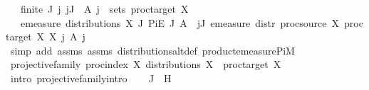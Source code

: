\begin{isabellebody}
\ \ \ {\isachardoublequoteopen}finite\ J{\isachardoublequoteclose}\ {\isachardoublequoteopen}{\isasymAnd}j{\isachardot}{\kern0pt}\ j{\isasymin}J\ {\isasymLongrightarrow}\ A\ j\ {\isasymin}\ sets\ {\isacharparenleft}{\kern0pt}proc{\isacharunderscore}{\kern0pt}target\ X{\isacharparenright}{\kern0pt}{\isachardoublequoteclose}\isanewline
\ \ \ {\isachardoublequoteopen}emeasure\ {\isacharparenleft}{\kern0pt}distributions\ X\ J{\isacharparenright}{\kern0pt}\ {\isacharparenleft}{\kern0pt}Pi\isactrlsub E\ J\ A{\isacharparenright}{\kern0pt}\ {\isacharequal}{\kern0pt}\ {\isacharparenleft}{\kern0pt}{\isasymProd}j{\isasymin}J{\isachardot}{\kern0pt}\ emeasure\ {\isacharparenleft}{\kern0pt}distr\ {\isacharparenleft}{\kern0pt}proc{\isacharunderscore}{\kern0pt}source\ X{\isacharparenright}{\kern0pt}\ {\isacharparenleft}{\kern0pt}proc{\isacharunderscore}{\kern0pt}target\ X{\isacharparenright}{\kern0pt}\ {\isacharparenleft}{\kern0pt}X\ j{\isacharparenright}{\kern0pt}{\isacharparenright}{\kern0pt}\ {\isacharparenleft}{\kern0pt}A\ j{\isacharparenright}{\kern0pt}{\isacharparenright}{\kern0pt}{\isachardoublequoteclose}\isanewline
%
\isadelimproof
\ \ %
\endisadelimproof
%
\isatagproof
{}\isamarkupfalse%
\ {\isacharparenleft}{\kern0pt}simp\ add{\isacharcolon}{\kern0pt}\ assms{\isacharparenleft}{\kern0pt}{}{\isacharparenright}{\kern0pt}\ assms{\isacharparenleft}{\kern0pt}{}{\isacharparenright}{\kern0pt}\ distributions{\isacharunderscore}{\kern0pt}altdef\ product{\isachardot}{\kern0pt}emeasure{\isacharunderscore}{\kern0pt}PiM{\isacharparenright}{\kern0pt}%
\endisatagproof
{\isafoldproof}%
%
\isadelimproof
\isanewline
%
\endisadelimproof
\isanewline
{}\isamarkupfalse%
\ projective{\isacharunderscore}{\kern0pt}family\ {\isachardoublequoteopen}{\isacharparenleft}{\kern0pt}proc{\isacharunderscore}{\kern0pt}index\ X{\isacharparenright}{\kern0pt}{\isachardoublequoteclose}\ {\isachardoublequoteopen}distributions\ X{\isachardoublequoteclose}\ {\isachardoublequoteopen}{\isacharparenleft}{\kern0pt}{\isasymlambda}{\isacharunderscore}{\kern0pt}{\isachardot}{\kern0pt}\ proc{\isacharunderscore}{\kern0pt}target\ X{\isacharparenright}{\kern0pt}{\isachardoublequoteclose}\isanewline
%
\isadelimproof
%
\endisadelimproof
%
\isatagproof
{}\isamarkupfalse%
\ {\isacharparenleft}{\kern0pt}intro\ projective{\isacharunderscore}{\kern0pt}family{\isachardot}{\kern0pt}intro{\isacharparenright}{\kern0pt}\isanewline
\ \ \isamarkupfalse%
\ J\ \ H\isanewline
\ \ \isamarkupfalse%

\end{isabellebody}
